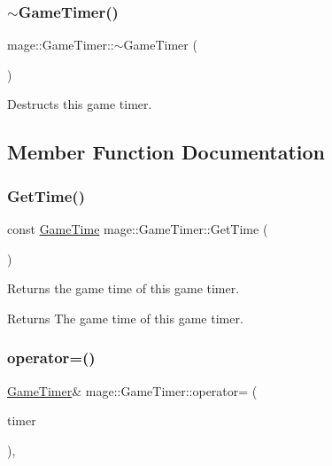 \subsubsection{\texorpdfstring{$\sim$\+Game\+Timer()}{~GameTimer()}}
{\footnotesize\ttfamily mage\+::\+Game\+Timer\+::$\sim$\+Game\+Timer (\begin{DoxyParamCaption}{ }\end{DoxyParamCaption})\hspace{0.3cm}{\ttfamily [default]}}

Destructs this game timer. 

\subsection{Member Function Documentation}
\mbox{\label{classmage_1_1_game_timer_a1598867084d2a6c8a7ec2d36e8e66aa4}} 
\subsubsection{\texorpdfstring{Get\+Time()}{GetTime()}}
{\footnotesize\ttfamily const \mbox{\hyperlink{classmage_1_1_game_time}{Game\+Time}} mage\+::\+Game\+Timer\+::\+Get\+Time (\begin{DoxyParamCaption}{ }\end{DoxyParamCaption})\hspace{0.3cm}{\ttfamily [noexcept]}}

Returns the game time of this game timer.

\begin{DoxyReturn}{Returns}
The game time of this game timer. 
\end{DoxyReturn}
\mbox{\label{classmage_1_1_game_timer_a9465e2d38d8810c2acb2cde2aafeaad1}} 
\subsubsection{\texorpdfstring{operator=()}{operator=()}\hspace{0.1cm}{\footnotesize\ttfamily [1/2]}}
{\footnotesize\ttfamily \mbox{\hyperlink{classmage_1_1_game_timer}{Game\+Timer}}\& mage\+::\+Game\+Timer\+::operator= (\begin{DoxyParamCaption}\item[{const \mbox{\hyperlink{classmage_1_1_game_timer}{Game\+Timer}} \&}]{timer }\end{DoxyParamCaption})\hspace{0.3cm}{\ttfamily [default]}, {\ttfamily [noexcept]}}

